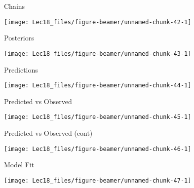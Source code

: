 \documentclass[11pt,ignorenonframetext,]{beamer}
\begin{document}
\begin{frame}{Chains}
\protect\hypertarget{chains}{}

\begin{center}\texttt{[image: Lec18\_files/figure-beamer/unnamed-chunk-42-1]} \end{center}

\end{frame}

\begin{frame}{Posteriors}
\protect\hypertarget{posteriors}{}

\begin{center}\texttt{[image: Lec18\_files/figure-beamer/unnamed-chunk-43-1]} \end{center}

\end{frame}

\begin{frame}{Predictions}
\protect\hypertarget{predictions-3}{}

\begin{center}\texttt{[image: Lec18\_files/figure-beamer/unnamed-chunk-44-1]} \end{center}

\end{frame}

\begin{frame}{Predicted vs Observed}
\protect\hypertarget{predicted-vs-observed-1}{}

\begin{center}\texttt{[image: Lec18\_files/figure-beamer/unnamed-chunk-45-1]} \end{center}

\end{frame}

\begin{frame}{Predicted vs Observed (cont)}
\protect\hypertarget{predicted-vs-observed-cont}{}

\begin{center}\texttt{[image: Lec18\_files/figure-beamer/unnamed-chunk-46-1]} \end{center}

\end{frame}

\begin{frame}{Model Fit}
\protect\hypertarget{model-fit}{}

\begin{center}\texttt{[image: Lec18\_files/figure-beamer/unnamed-chunk-47-1]} \end{center}

\end{frame}
\end{document}

